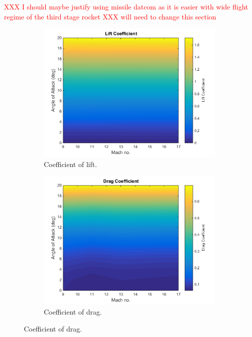		\textcolor{red}{XXX I should maybe justify using missile datcom as it is easier with wide flight regime of the third stage rocket}
			\textcolor{red}{XXX will need to change this section}
			\begin{figure}[ht]
				\begin{subfigure}{.5\textwidth}
					\centering
					\includegraphics[width=0.99\linewidth]{figures/3_vehicle_design/ThirdStageCl}
					\caption{Coefficient of lift.}
					\label{fig:Cl-ThirdStage}
				\end{subfigure}
				\begin{subfigure}{.5\textwidth}
					\centering
					\includegraphics[width=0.99\linewidth]{figures/3_vehicle_design/ThirdStageCd}
					\caption{Coefficient of drag.}

\end{subfigure}
\end{figure}
